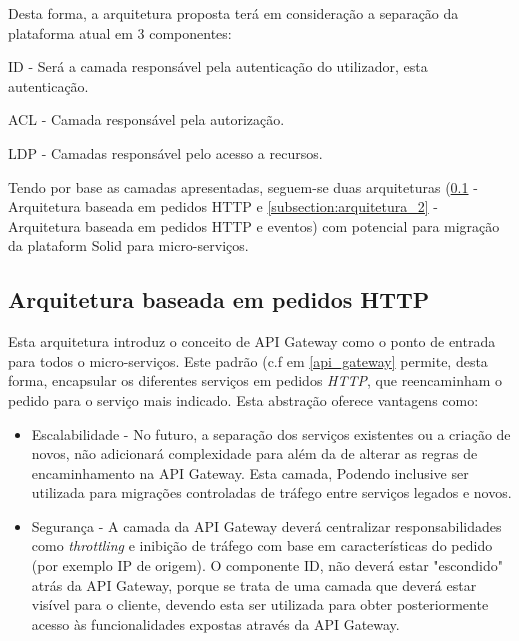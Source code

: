 Desta forma, a arquitetura proposta terá em consideração a separação da plataforma atual em 3 componentes:
\begin{description}
    \item ID -  Será a camada responsável pela autenticação do utilizador, esta autenticação.
    \item ACL - Camada responsável pela autorização.
    \item LDP - Camadas responsável pelo acesso a recursos.
\end{description}


Tendo por base as camadas apresentadas, seguem-se duas arquiteturas (\ref{subsection:arquitetura_1} - Arquitetura baseada em pedidos HTTP e \ref{subsection:arquitetura_2} - Arquitetura baseada em pedidos HTTP e eventos) com potencial para migração da plataform Solid para micro-serviços.

\subsection{Arquitetura baseada em pedidos HTTP} \label{subsection:arquitetura_1}

Esta arquitetura introduz o conceito de API Gateway como o ponto de entrada para todos o micro-serviços. Este padrão (c.f em \ref{api_gateway} permite, desta forma, encapsular os diferentes serviços em pedidos \emph{HTTP}, que reencaminham o pedido para o serviço mais indicado. Esta abstração oferece vantagens como:

\begin{itemize}
    \item Escalabilidade - No futuro, a separação dos serviços existentes ou a criação de novos, não adicionará complexidade para além da de alterar as regras de encaminhamento na API Gateway. Esta camada, Podendo inclusive ser utilizada para migrações controladas de tráfego entre serviços legados e novos.
    
    \item Segurança - A camada da API Gateway deverá centralizar responsabilidades como \emph{throttling} e inibição de tráfego com base em características do pedido (por exemplo IP de origem). O componente ID, não deverá estar "escondido" atrás da API Gateway, porque se trata de uma camada que deverá estar visível para o cliente, devendo esta ser utilizada para obter posteriormente acesso às funcionalidades expostas através da API Gateway.
\end{itemize}

